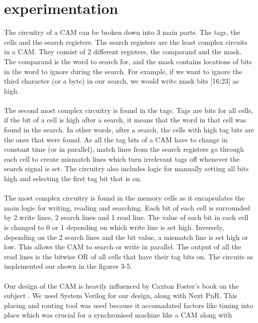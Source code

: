 \section{experimentation}
The circuitry of a CAM can be broken down into 3 main parts. The tags, the cells and the search registers. 
The search registers are the least complex circuits in a CAM. They consist of 2 different registers, the comparand and the mask. 
The comparand is the word to search for, and the mask contains locations of bits in the word to ignore during the search.
For example, if we want to ignore the third character (or a byte) in our search, we would write mask bits [16:23] as high.
\\\\
The second most complex circuitry is found in the tags.
Tags are bits for all cells, if the bit of a cell is high after a search, it means that the word in that cell was found in the search. 
In other words, after a search, the cells with high tag bits are the ones that were found. 
As all the tag bits of a CAM have to change in constant time (or in parallel), match lines from the search registers go through each cell to create mismatch lines which turn irrelevant tags off whenever the search signal is set.
The circuitry also includes logic for manually setting all bits high and selecting the first tag bit that is on.
\\\\
The most complex circuitry is found in the memory cells as it encapsulates the main logic for writing, reading and searching. 
Each bit of each cell is surrounded by 2 write lines, 2 search lines and 1 read line. 
The value of each bit in each cell is changed to 0 or 1 depending on which write line is set high. 
Inversely, depending on the 2 search lines and the bit value, a mismatch line is set high or low. 
This allows the CAM to search or write in parallel. 
The output of all the read lines is the bitwise OR of all cells that have their tag bits on. 
The circuits as implemented our shown in the figures 3-5. 
\\\\
Our design of the CAM is heavily influenced by Caxton Foster's book on the subject \cite{capp}.
We used System Verilog for our design, along with Next PnR. 
This placing and routing tool was used because it accomadated factors like timing into place which was crucial for a synchronised machine like a CAM along with